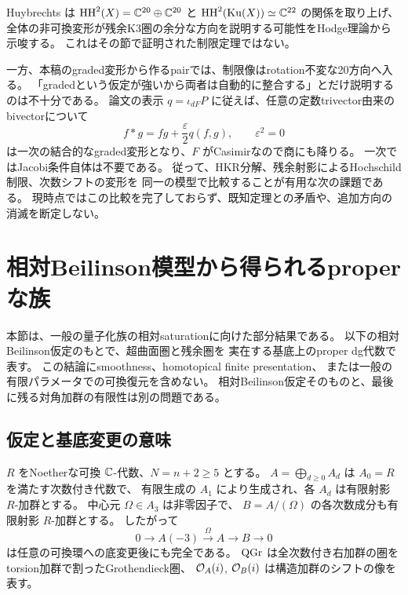 Huybrechts \cite[Section 9]{HuyUpdate} は
\(\operatorname{HH}^2(X)=\mathbb C^{20}\oplus\mathbb C^{20}\) と
\(\operatorname{HH}^2(\operatorname{Ku}(X))\simeq\mathbb C^{22}\) の関係を取り上げ、
全体の非可換変形が残余K3圏の余分な方向を説明する可能性をHodge理論から示唆する。
これはその節で証明された制限定理ではない。

一方、本稿のgraded変形から作るpairでは、制限像はrotation不変な20方向へ入る。
「gradedという仮定が強いから両者は自動的に整合する」とだけ説明するのは不十分である。
論文の表示 \(q=\iota_{dF}P\) に従えば、任意の定数trivector由来のbivectorについて
\[
 f*g=fg+\frac\varepsilon2q(f,g),\qquad\varepsilon^2=0
\]
は一次の結合的なgraded変形となり、\(F\) がCasimirなので商にも降りる。
一次ではJacobi条件自体は不要である。
従って、HKR分解、残余射影によるHochschild制限、次数シフトの変形を
同一の模型で比較することが有用な次の課題である。
現時点ではこの比較を完了しておらず、既知定理との矛盾や、追加方向の消滅を断定しない。

\section{相対Beilinson模型から得られるproperな族}
\label{sec:relative-proper-model}

本節は、一般の量子化族の相対saturationに向けた部分結果である。
以下の相対Beilinson仮定のもとで、超曲面圏と残余圏を
実在する基底上のproper dg代数で表す。
この結論にsmoothness、homotopical finite presentation、
または一般の有限パラメータでの可換復元を含めない。
相対Beilinson仮定そのものと、最後に残る対角加群の有限性は別の問題である。

\subsection{仮定と基底変更の意味}

\(R\) をNoetherな可換 \(\mathbb C\)-代数、\(N=n+2\ge5\) とする。
\(A=\bigoplus_{d\ge0}A_d\) は \(A_0=R\) を満たす次数付き代数で、
有限生成の \(A_1\) により生成され、各 \(A_d\) は有限射影 \(R\)-加群とする。
中心元 \(\Omega\in A_3\) は非零因子で、
\(B=A/(\Omega)\) の各次数成分も有限射影 \(R\)-加群とする。
したがって
\[
 0\longrightarrow A(-3)\xrightarrow{\Omega}A
   \longrightarrow B\longrightarrow0
 \tag{Q}\label{eq:relative-quotient-sequence}
\]
は任意の可換環への底変更後にも完全である。
\(\operatorname{QGr}\) は全次数付き右加群の圏をtorsion加群で割ったGrothendieck圏、
\(\mathcal O_A(i)\), \(\mathcal O_B(i)\) は構造加群のシフトの像を表す。


